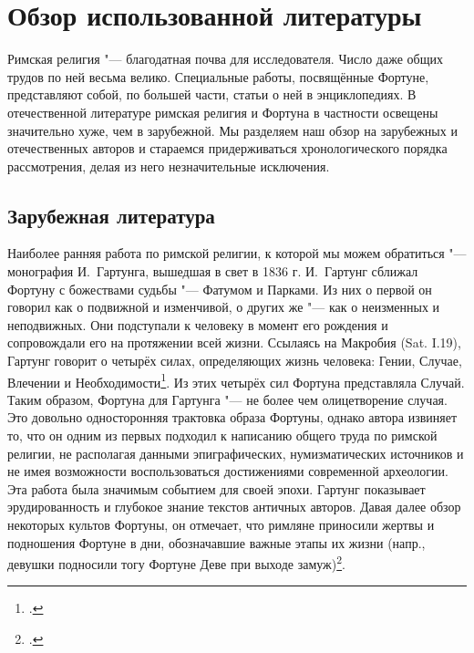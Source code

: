 \chapter*{Обзор использованной литературы}

Римская религия "--- благодатная почва для исследователя. Число даже общих трудов по ней весьма велико. Специальные работы, посвящённые Фортуне, представляют собой, по большей части, статьи о ней в энциклопедиях. В отечественной литературе римская религия и Фортуна в частности освещены значительно хуже, чем в зарубежной. Мы разделяем наш обзор на зарубежных и отечественных авторов и стараемся придерживаться хронологического порядка рассмотрения, делая из него незначительные исключения.

\section*{Зарубежная литература}
{}


Наиболее ранняя работа по римской религии, к которой мы можем обратиться "--- монография И.~Гартунга, вышедшая в свет в 1836 г. И.~Гартунг сближал Фортуну с божествами судьбы "--- Фатумом и Парками. Из них о первой он говорил как о подвижной и изменчивой, о других же "--- как о неизменных и неподвижных. Они подступали к человеку в момент его рождения и сопровождали его на протяжении всей жизни. Ссылаясь на Макробия (Sat. I.19), Гартунг говорит о четырёх силах, определяющих жизнь человека: Гении, Случае, Влечении и Необходимости\footcite[S. 233]{Hartung1836}. Из этих четырёх сил Фортуна представляла Случай. Таким образом, Фортуна для Гартунга "--- не более чем олицетворение случая. Это довольно односторонняя трактовка образа Фортуны, однако автора извиняет то, что он одним из первых подходил к написанию общего труда по римской религии, не располагая данными эпиграфических, нумизматических источников и не имея возможности воспользоваться достижениями современной археологии. Эта работа была значимым событием для своей эпохи. Гартунг показывает эрудированность и глубокое знание текстов античных авторов. Давая далее обзор некоторых культов Фортуны, он отмечает, что римляне приносили жертвы и подношения Фортуне в дни, обозначавшие важные этапы их жизни (напр., девушки подносили тогу Фортуне Деве при выходе замуж)\footcite[S. 235]{Hartung1836}.



